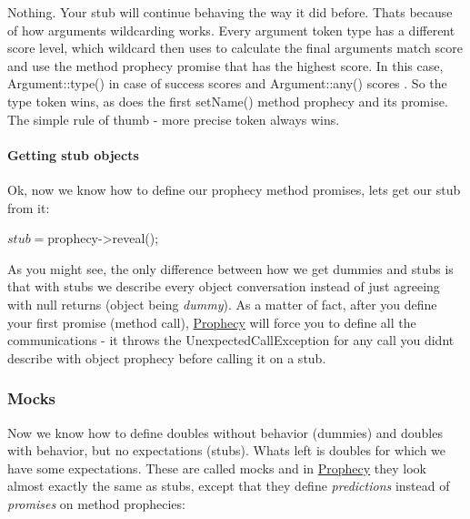Nothing. Your stub will continue behaving the way it did before. That\textquotesingle{}s because of how arguments wildcarding works. Every argument token type has a different score level, which wildcard then uses to calculate the final arguments match score and use the method prophecy promise that has the highest score. In this case, {\ttfamily Argument\+::type()} in case of success scores {} and {\ttfamily Argument\+::any()} scores {}. So the type token wins, as does the first {\ttfamily set\+Name()} method prophecy and its promise. The simple rule of thumb -\/ more precise token always wins.

\paragraph*{Getting stub objects}

Ok, now we know how to define our prophecy method promises, let\textquotesingle{}s get our stub from it\+:


\begin{DoxyCode}
$stub = $prophecy->reveal();
\end{DoxyCode}


As you might see, the only difference between how we get dummies and stubs is that with stubs we describe every object conversation instead of just agreeing with {\ttfamily null} returns (object being {\itshape dummy}). As a matter of fact, after you define your first promise (method call), \mbox{\hyperlink{namespace_prophecy}{Prophecy}} will force you to define all the communications -\/ it throws the {\ttfamily Unexpected\+Call\+Exception} for any call you didn\textquotesingle{}t describe with object prophecy before calling it on a stub.

\subsubsection*{Mocks}

Now we know how to define doubles without behavior (dummies) and doubles with behavior, but no expectations (stubs). What\textquotesingle{}s left is doubles for which we have some expectations. These are called mocks and in \mbox{\hyperlink{namespace_prophecy}{Prophecy}} they look almost exactly the same as stubs, except that they define {\itshape predictions} instead of {\itshape promises} on method prophecies\+:




